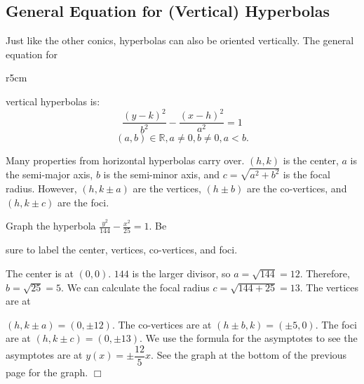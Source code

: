 \documentclass[lang=en,11pt]{elegantbook}
\begin{document}
\subsection{General Equation for (Vertical) Hyperbolas}
\noindent Just like the other conics, hyperbolas can also be oriented vertically.  The general equation for 

\begin{wrapfigure}{r}{5cm}
\end{wrapfigure}

\noindent vertical hyperbolas is:
$$ \frac{(y-k)^2}{b^2} - \frac{(x-h)^2}{a^2} = 1$$$$(a,b)\in\mathbb{R},a\neq 0,b\neq 0,a<b.$$

Many properties from horizontal hyperbolas carry over.  $(h,k)$ is the center, $a$ is the semi-major axis, $b$ is the semi-minor axis, and $c=\sqrt{a^2+b^2}$ is the focal radius.  However, $(h,k \pm a)$ are the vertices, $(h \pm b)$ are the co-vertices, and $(h,k \pm c)$ are the foci.

\begin{example}
Graph the hyperbola $\frac{y^2}{144} - \frac{x^2}{25} = 1$.  Be 

\noindent sure to label the center, vertices, co-vertices, and foci.
\end{example}

\begin{solution}
The center is at $(0,0)$.  $144$ is the larger divisor, so $a=\sqrt{144}=12$.  Therefore, $b=\sqrt{25}=5$.  We can calculate the focal radius $c=\sqrt{144+25}=13$.  The vertices are at 
\end{solution}

\noindent $(h, k \pm a) = (0,\pm 12)$.  The co-vertices are at $(h\pm b,k)=(\pm 5,0)$.  The foci are at $(h ,k \pm c) = (0, \pm 13)$.  We use the formula for the asymptotes to see the asymptotes are at $y(x)=\pm\dfrac{12}{5}x.$ See the graph at the bottom of the previous page for the graph. $\Box$
\end{document}
